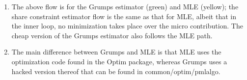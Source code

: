 \documentclass[12pt]{article}
\begin{document}
{\LARGE
\begin{enumerate}
    \item The above flow is for the Grumps estimator (green) and MLE (yellow); the share constraint estimator flow is the same as that for MLE, albeit that in the inner loop, no minimization takes place over the micro contribution.  The cheap version of the Grumps estimator also follows the MLE path.
    \item The main difference between Grumps and MLE is that MLE uses the optimization code found in the Optim package, whereas Grumps uses a hacked version thereof that can be found in common/optim/pmlalgo.
\end{enumerate}
}
\end{document}
